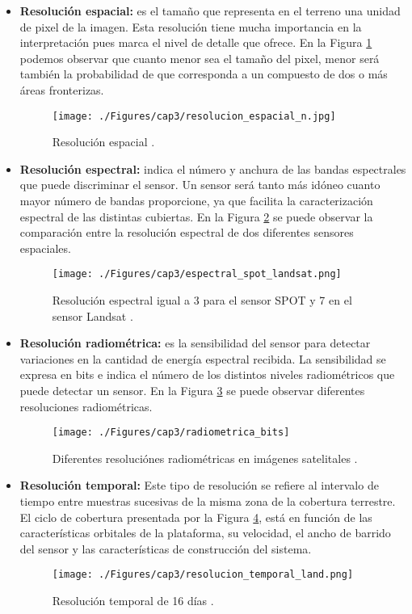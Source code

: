 \begin{itemize}
		\item \textbf{Resoluci\'on espacial:} es el tama\~{n}o que representa en el terreno una unidad de pixel de la imagen. Esta resoluci\'on tiene mucha importancia en la interpretaci\'on pues marca el nivel de detalle que ofrece. En la Figura \ref{fig:espatialRes} podemos observar que cuanto menor sea el tama\~{n}o del pixel, menor ser\'a tambi\'en la probabilidad de que corresponda a un compuesto de dos o m\'as \'areas fronterizas.
		\begin{figure}[H]
			\centering
			\texttt{[image: ./Figures/cap3/resolucion\_espacial\_n.jpg]}
			\caption{Resoluci\'on espacial \cite{chara2015sate}.}
			\label{fig:espatialRes}
		\end{figure}
			\item \textbf{Resoluci\'on espectral:} indica el n\'umero y anchura de las bandas espectrales que puede discriminar el sensor. Un sensor ser\'a tanto m\'as id\'oneo cuanto mayor n\'umero de bandas proporcione, ya que facilita la caracterizaci\'on espectral de las distintas cubiertas. En la Figura \ref{fig:espectralRes} se puede observar la comparaci\'on entre la resoluci\'on espectral de dos diferentes sensores espaciales.
				\begin{figure}[H]
					\centering
					\texttt{[image: ./Figures/cap3/espectral\_spot\_landsat.png]}
					\caption{Resoluci\'on espectral igual a 3 para el sensor SPOT y 7 en el sensor Landsat \cite{martinez2005percepcion}.}
					\label{fig:espectralRes}
				\end{figure}
		\item \textbf{Resoluci\'on radiom\'etrica:} es la sensibilidad del sensor para detectar variaciones en la cantidad de energ\'ia espectral recibida. La sensibilidad se expresa en bits e indica el n\'umero de los distintos niveles radiom\'etricos que puede detectar un sensor. En la Figura \ref{fig:radioRes} se puede observar diferentes resoluciones radiom\'etricas.
						\begin{figure}[H]
							\centering
							\texttt{[image: ./Figures/cap3/radiometrica\_bits]}
							\caption{Diferentes resoluci\'ones radiom\'etricas en im\'agenes satelitales .}
							\label{fig:radioRes}
						\end{figure}
		\item \textbf{Resoluci\'on temporal:} Este tipo de resoluci\'on se refiere al intervalo de tiempo entre muestras sucesivas de la misma zona de la cobertura terrestre. El ciclo de cobertura presentada por la Figura \ref{fig:temporaRes}, est\'a en funci\'on de las caracter\'isticas orbitales de la plataforma, su velocidad, el ancho de barrido del sensor y las caracter\'isticas de construcci\'on del sistema.
			\begin{figure}[H]
					\centering
					\texttt{[image: ./Figures/cap3/resolucion\_temporal\_land.png]}
					\caption{Resoluci\'on temporal de 16 d\'ias \cite{teledet2015Combi}.}
					\label{fig:temporaRes}
				\end{figure}
	\end{itemize}

